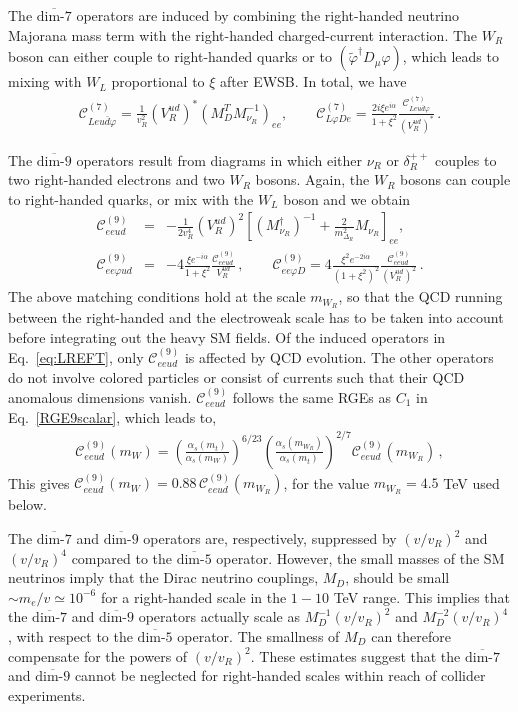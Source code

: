 \documentclass[letterpaper,11pt]{article}
\newcommand{\al}{\alpha}
\newcommand{\dt}{\delta}
\newcommand{\bea}{\begin{eqnarray}}
\newcommand{\eea}{\end{eqnarray}}
\newcommand{\vp}{\varphi}
\newcommand{\sq}{^{2}}
\newcommand{\nn}{\nonumber}
\newcommand{\textoverline}[1]{$\overline{\mbox{#1}}$}
\begin{document}
The \textoverline{dim-7} operators are induced by combining the right-handed neutrino Majorana mass term with the right-handed charged-current interaction. The $W_R$ boson can either couple to right-handed quarks or to $(\tilde \vp^\dagger D_\mu \vp)$, which leads to mixing with $W_L$ proportional to $\xi$ after EWSB. In total, we have
\bea\label{dim7match}
\mathcal C^{(7)}_{Leu\bar d \vp}  ={\frac{1}{v_R^2}} \left(V_R^{ud}\right)^* \left( M_D^TM_{\nu_R}^{-1} \right)_{ee} ,\qquad \mathcal C^{(7)}_{L\vp De}  =\frac{2i\xi e^{i\al}}{1+\xi^2}\frac{\mathcal C^{(7)}_{Leu\bar d \vp}}{\left(V_R^{ud}\right)^*}\,.
\eea


The \textoverline{dim-9} operators result from diagrams in which either $\nu_R$ or $\dt^{++}_R$ couples to two right-handed electrons and two $W_R$ bosons. Again, the $W_R$ bosons can couple to right-handed quarks, or mix with the $W_L$ boson and we obtain
\bea\label{dim9match}
\mathcal C^{(9)}_{eeud} &=&-\frac{1}{2 v_R^4} \left(V_{R}^{ud}\right)^2\left[\left(M_{\nu_R}^\dagger\right)^{-1}+\frac{2}{m_{\Delta_R}\sq} M_{\nu_R}\right]_{ee},\nn\\
\mathcal C^{(9)}_{ee\varphi u d}&=&-4\frac{\xi e^{-i\al}}{1+\xi\sq}\frac{\mathcal C^{(9)}_{eeud}}{V_{R}^{ud}}\,,\qquad 
\mathcal C_{ee \varphi D}^{(9)}=4\frac{\xi\sq e^{-2i\al}}{(1+\xi\sq)\sq}\frac{\mathcal C^{(9)}_{eeud}}{\left(V_{R}^{ud}\right)\sq}\,.
\eea
The above matching conditions hold at the scale $m_{W_R}$, so that the QCD running between the right-handed and the electroweak scale has to be taken into account before integrating out the heavy SM fields. Of the induced operators in Eq.\ \eqref{eq:LREFT}, only  $ \mathcal C_{eeud}^{(9)}$ is affected by QCD evolution. The other operators do not involve colored particles or consist of currents such that their QCD anomalous dimensions vanish. 
$\mathcal C_{eeud}^{(9)}$ follows the same RGEs as $C_1$ in Eq.\ \eqref{RGE9scalar}, which leads to,
\bea
\mathcal C_{eeud}^{(9)}(m_W) =\left( \frac{\al_s(m_{t})}{\al_s(m_{W})}\right)^{6/23}\left( \frac{\al_s(m_{W_R})}{\al_s(m_{t})}\right)^{2/7}\mathcal C_{eeud}^{(9)}(m_{W_R})\,, 
\eea
This gives $\mathcal C_{eeud}^{(9)}(m_W) =0.88\,\mathcal C_{eeud}^{(9)}(m_{W_R})$, for the value $m_{W_R}=4.5$ TeV used below. 

The  \textoverline{dim-7} and  \textoverline{dim-9} operators are, respectively, suppressed by $(v/v_R)^2$ and $(v/v_R)^4$ compared to the  \textoverline{dim-5} operator. However,  the small masses of the SM neutrinos imply that the Dirac neutrino couplings, $M_D$, should be small $\sim m_e/v\simeq 10^{-6}$ for a right-handed scale in the $1-10$ TeV range. This implies that the \textoverline{dim-7} and  \textoverline{dim-9} operators actually scale as $M_D^{-1}(v/v_R)^2$ and $M_D^{-2}(v/v_R)^4$, with respect to the 
 \textoverline{dim-5} operator. The smallness of $M_D$ can therefore compensate for the powers of $(v/v_R)^2$. These estimates suggest that the \textoverline{dim-7} and  \textoverline{dim-9} cannot be neglected for right-handed scales within reach of collider experiments.
 
\end{document}
